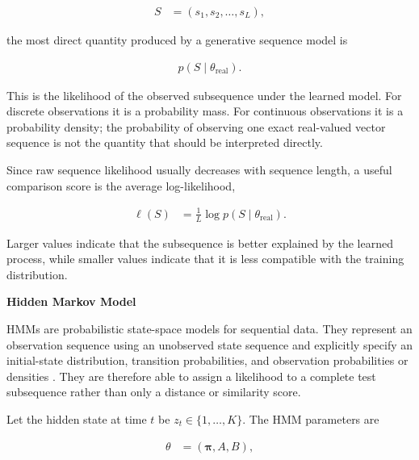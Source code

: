 \documentclass{book}
\providecommand{\ProjectDeepHeading}[2]{%
    \par\medskip\noindent\textbf{#2}\par\smallskip
}
\begin{document}
        \begin{align}
            S
            &=
            (s_1,s_2,\dots,s_L),
        \end{align}

        \noindent
        the most direct quantity produced by a generative sequence model is

        \begin{align}
            p(S\mid\ensuremath{\theta}_{\mathrm{real}}).
        \end{align}

        \noindent
        This is the likelihood of the observed subsequence under the learned model. For discrete observations it is a probability mass. For continuous observations it is a probability density; the probability of observing one exact real-valued vector sequence is not the quantity that should be interpreted directly.

        Since raw sequence likelihood usually decreases with sequence length, a useful comparison score is the average log-likelihood,

        \begin{align}
            \ell(S)
            &=
            \frac{1}{L}
            \log p(S\mid\ensuremath{\theta}_{\mathrm{real}}).
        \end{align}

        \noindent
        Larger values indicate that the subsequence is better explained by the learned process, while smaller values indicate that it is less compatible with the training distribution.

    \ProjectDeepHeading{3}{Hidden Markov Model}

        HMMs are probabilistic state-space models for sequential data. They represent an observation sequence using an unobserved state sequence and explicitly specify an initial-state distribution, transition probabilities, and observation probabilities or densities \cite{murphy-2002-dynamic-bayesian-networks-representation-inference-and-learning}. They are therefore able to assign a likelihood to a complete test subsequence rather than only a distance or similarity score.

        Let the hidden state at time \(t\) be \(z_t\in\{1,\dots,K\}\). The HMM parameters are

        \begin{align}
            \ensuremath{\theta}
            &=
            (\boldsymbol{\ensuremath{\pi}},A,B),
        \end{align}
\end{document}
